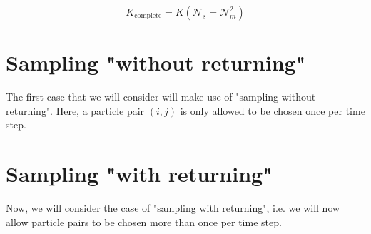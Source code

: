     $$K_\text{complete}=K(\mathcal{N}_s=\mathcal{N}_m^2)$$

\section{Sampling "without returning"}

    The first case that we will consider will make use of "sampling without returning". Here, a 
    particle pair $(i, j)$ is only allowed to be chosen once per time step.

\section{Sampling "with returning"}

    Now, we will consider the case of "sampling with returning", i.e. we will now allow particle 
    pairs to be chosen more than once per time step.


